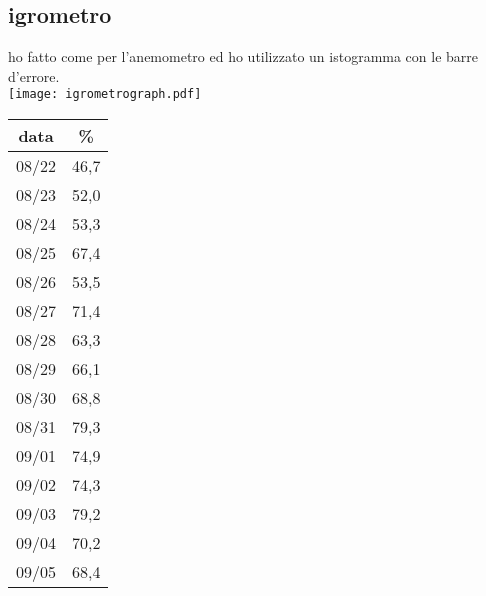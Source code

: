 \documentclass[12pt]{article}
\begin{document}
\subsection{igrometro}
ho fatto come per l'anemometro ed ho utilizzato un istogramma con le barre d'errore. \\
\texttt{[image: igrometrograph.pdf]} 
\begin{tabular}{|c|c|}
    \hline
    data & \% \\
    \hline
     08/22 &  46,7\\
     08/23 &  52,0\\
     08/24 &  53,3\\
     08/25 &  67,4\\
     08/26 &  53,5\\
     08/27 &  71,4\\
     08/28 &  63,3\\
     08/29 &  66,1\\
     08/30 &  68,8\\
     08/31 &  79,3\\
     09/01 &  74,9\\
     09/02 &  74,3\\
     09/03 &  79,2\\
     09/04 &  70,2\\
     09/05 &  68,4\\
     \hline
\end{tabular} \\
\newpage


\nocite{*}
\end{document}
